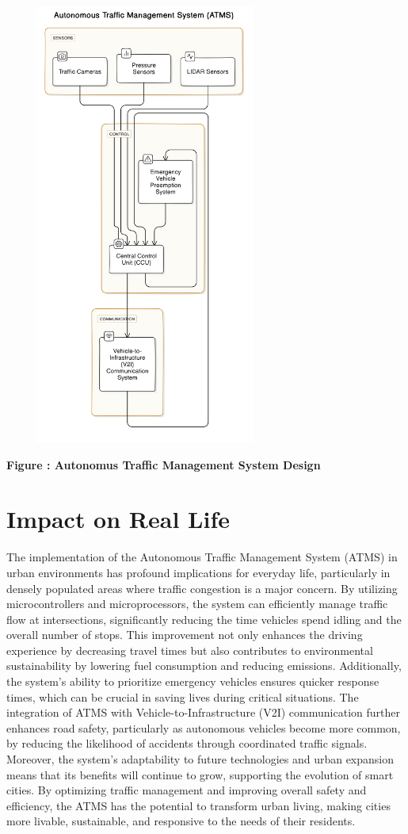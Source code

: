 \documentclass{scrreprt}
\begin{document}
\begin{center}
    {\includegraphics[width=350px, height=550px]{e.png}}
    \parbox{0.8\textwidth}{ 
        \centering
        \textbf{Figure : Autonomus Traffic Management System Design}
    }
\end{center}


\section*{Impact on Real Life}

The implementation of the Autonomous Traffic Management System (ATMS) in urban environments has profound implications for everyday life, particularly in densely populated areas where traffic congestion is a major concern. By utilizing microcontrollers and microprocessors, the system can efficiently manage traffic flow at intersections, significantly reducing the time vehicles spend idling and the overall number of stops. This improvement not only enhances the driving experience by decreasing travel times but also contributes to environmental sustainability by lowering fuel consumption and reducing emissions. Additionally, the system’s ability to prioritize emergency vehicles ensures quicker response times, which can be crucial in saving lives during critical situations. The integration of ATMS with Vehicle-to-Infrastructure (V2I) communication further enhances road safety, particularly as autonomous vehicles become more common, by reducing the likelihood of accidents through coordinated traffic signals. Moreover, the system's adaptability to future technologies and urban expansion means that its benefits will continue to grow, supporting the evolution of smart cities. By optimizing traffic management and improving overall safety and efficiency, the ATMS has the potential to transform urban living, making cities more livable, sustainable, and responsive to the needs of their residents.
\end{document}
